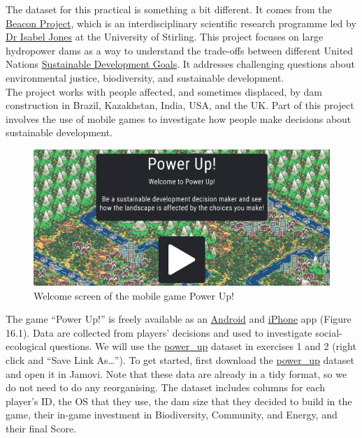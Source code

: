 \documentclass[
]{scrbook}
\begin{document}
The dataset for this practical is something a bit different.
It comes from the \href{https://www.thebeaconproject.net/}{Beacon Project}, which is an interdisciplinary scientific research programme led by \href{https://www.stir.ac.uk/people/256518}{Dr Isabel Jones} at the University of Stirling.
This project focuses on large hydropower dams as a way to understand the trade-offs between different United Nations \href{https://sdgs.un.org/goals}{Sustainable Development Goals}.
It addresses challenging questions about environmental justice, biodiversity, and sustainable development.\\
The project works with people affected, and sometimes displaced, by dam construction in Brazil, Kazakhstan, India, USA, and the UK.
Part of this project involves the use of mobile games to investigate how people make decisions about sustainable development.

\begin{figure}
\includegraphics[width=0.8\linewidth]{img/power_up} \caption{Welcome screen of the mobile game Power Up!}\label{fig:unnamed-chunk-69}
\end{figure}

The game ``Power Up!'' is freely available as an \href{https://play.google.com/store/apps/details?id=com.hyperluminal.stirlinguniversity.sustainabledevelopmentgame}{Android} and \href{https://apps.apple.com/gb/app/power-up/id1585634888}{iPhone} app (Figure 16.1).
Data are collected from players' decisions and used to investigate social-ecological questions.
We will use the \href{https://raw.githubusercontent.com/bradduthie/SCIU4T4/main/data/power_up.csv}{power\_up} dataset in exercises 1 and 2 (right click and ``Save Link As\ldots{}'').
To get started, first download the \href{https://raw.githubusercontent.com/bradduthie/SCIU4T4/main/data/power_up.csv}{power\_up} dataset and open it in Jamovi.
Note that these data are already in a tidy format, so we do not need to do any reorganising.
The dataset includes columns for each player's ID, the OS that they use, the dam size that they decided to build in the game, their in-game investment in Biodiversity, Community, and Energy, and their final Score.
\end{document}
